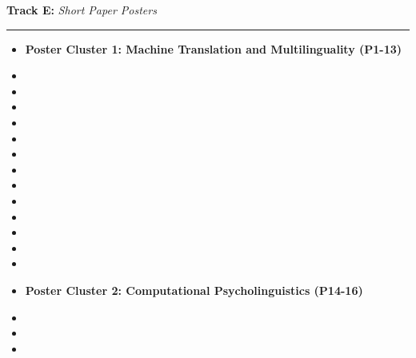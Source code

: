 \bigskip{}
\noindent \textbf{Track E:} \emph{Short Paper Posters} \hfill \emph{}\smallskip{}

\noindent \rule[0.5ex]{1\columnwidth}{1pt}
\begin{itemize}
\item []\textbf{Poster Cluster 1: Machine Translation and Multilinguality (P1-13)}
\item {}
\item {}
\item {}
\item {}
\item {}
\item {}
\item {}
\item {}
\item {}
\item {}
\item {}
\item {}
\item {}
\item []\textbf{Poster Cluster 2: Computational Psycholinguistics (P14-16)}
\item {}
\item {}
\item {}
\end{itemize}

\clearpage
